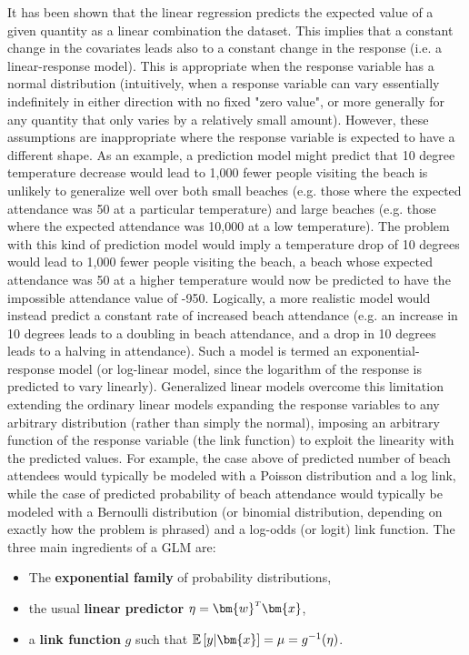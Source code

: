 It has been shown that the linear regression predicts the expected value of a given quantity as a linear combination the dataset. This implies that a constant change in the covariates leads also to a constant change in the response (i.e. a linear-response model). This is appropriate when the response variable has a normal distribution (intuitively, when a response variable can vary essentially indefinitely in either direction with no fixed "zero value", or more generally for any quantity that only varies by a relatively small amount).
However, these assumptions are inappropriate where the response variable is expected to have a different shape. 
As an example, a prediction model might predict that 10 degree temperature decrease would lead to 1,000 fewer people visiting the beach is unlikely to generalize well over both small beaches (e.g. those where the expected attendance was 50 at a particular temperature) and large beaches (e.g. those where the expected attendance was 10,000 at a low temperature). The problem with this kind of prediction model would imply a temperature drop of 10 degrees would lead to 1,000 fewer people visiting the beach, a beach whose expected attendance was 50 at a higher temperature would now be predicted to have the impossible attendance value of -950. Logically, a more realistic model would instead predict a constant rate of increased beach attendance (e.g. an increase in 10 degrees leads to a doubling in beach attendance, and a drop in 10 degrees leads to a halving in attendance). Such a model is termed an exponential-response model (or log-linear model, since the logarithm of the response is predicted to vary linearly).
Generalized linear models overcome this limitation extending the ordinary linear models expanding the response variables to any arbitrary distribution (rather than simply the normal), imposing an arbitrary function of the response variable (the link function) to exploit the linearity with the predicted values. 
For example, the case above of predicted number of beach attendees would typically be modeled with a Poisson distribution and a log link, while the case of predicted probability of beach attendance would typically be modeled with a Bernoulli distribution (or binomial distribution, depending on exactly how the problem is phrased) and a log-odds (or logit) link function.
The three main ingredients of a GLM are:
\begin{itemize}
    \item The \textbf{exponential family} of probability distributions,
    \item the usual \textbf{linear predictor} $\eta = \transpose{\bm{w}}\bm{x}$,
    \item a \textbf{link function} $g$ such that $\expectation{y|\bm{x}} = \mu = g^{-1}(\eta)$.
\end{itemize}

